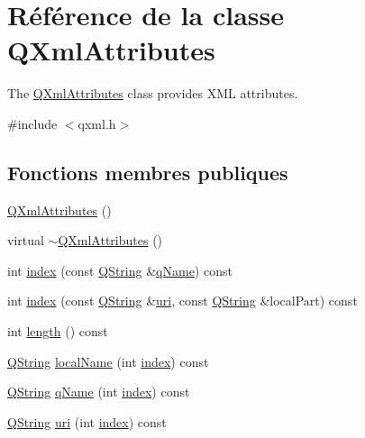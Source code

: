 \hypertarget{class_q_xml_attributes}{}\section{Référence de la classe Q\+Xml\+Attributes}
\label{class_q_xml_attributes}


The \hyperlink{class_q_xml_attributes}{Q\+Xml\+Attributes} class provides X\+M\+L attributes.  




{\ttfamily \#include $<$qxml.\+h$>$}

\subsection*{Fonctions membres publiques}
\begin{DoxyCompactItemize}
\item 
\hyperlink{class_q_xml_attributes_a074730261cfe3a0f4292cbda7854892b}{Q\+Xml\+Attributes} ()
\item 
virtual \hyperlink{class_q_xml_attributes_a2d482c168ff403041fc1dd2fc8044a7b}{$\sim$\+Q\+Xml\+Attributes} ()
\item 
int \hyperlink{class_q_xml_attributes_a542da36bc124fbee3cbc48f555c02c19}{index} (const \hyperlink{class_q_string}{Q\+String} \&\hyperlink{class_q_xml_attributes_a1cb2a771348a023deb7d90c901aafe6c}{q\+Name}) const 
\item 
int \hyperlink{class_q_xml_attributes_a2269a55045b16c01f0c831146c09e2d1}{index} (const \hyperlink{class_q_string}{Q\+String} \&\hyperlink{class_q_xml_attributes_a5653460e735986eeab8ae7992cc9158b}{uri}, const \hyperlink{class_q_string}{Q\+String} \&local\+Part) const 
\item 
int \hyperlink{class_q_xml_attributes_a35be039fcce25d5d1a7d5be6f3024383}{length} () const 
\item 
\hyperlink{class_q_string}{Q\+String} \hyperlink{class_q_xml_attributes_ace9a01af51817fdfbd76cebe3b83f185}{local\+Name} (int \hyperlink{class_q_xml_attributes_a542da36bc124fbee3cbc48f555c02c19}{index}) const 
\item 
\hyperlink{class_q_string}{Q\+String} \hyperlink{class_q_xml_attributes_a1cb2a771348a023deb7d90c901aafe6c}{q\+Name} (int \hyperlink{class_q_xml_attributes_a542da36bc124fbee3cbc48f555c02c19}{index}) const 
\item 
\hyperlink{class_q_string}{Q\+String} \hyperlink{class_q_xml_attributes_a5653460e735986eeab8ae7992cc9158b}{uri} (int \hyperlink{class_q_xml_attributes_a542da36bc124fbee3cbc48f555c02c19}{index}) const 

\end{DoxyCompactItemize}
